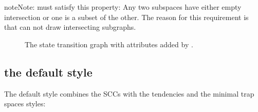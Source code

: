 \documentclass[letterpaper,10pt,english]{sphinxmanual}
\begin{document}
\begin{sphinxadmonition}{note}{Note:}
 must satisfy this property:
Any two subspaces have either empty intersection or one is a subset of the other.
The reason for this requirement is that  can not draw intersecting subgraphs.
\end{sphinxadmonition}

\begin{figure}[htbp]
\centering
\capstart

\noindent{}
\caption{The state transition graph  with attributes added by {\hyperref[\detokenize{StateTransitionGraphs:add-style-subspaces}]{}}.}\label{\detokenize{Manual:figure15}}\label{\detokenize{Manual:id19}}\end{figure}


\subsection{the default style}
\label{\detokenize{Manual:id5}}
The default style combines the SCCs with the tendencies and the minimal trap spaces styles:

\begin{sphinxVerbatim}[commandchars=\\\{\}]
  \PYG{p}{[}  \PYG{p}{]}
  
   
\PYG{p}{[}\PYG{p}{]}  
 
 
\end{sphinxVerbatim}
\end{document}

